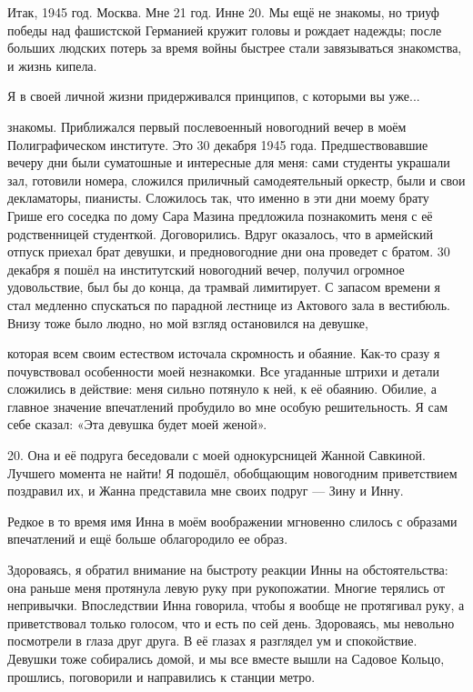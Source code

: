 Итак, 1945 год. Москва. Мне 21 год. Инне 20. Мы ещё не знакомы, но триуф  победы над фашистской Германией кружит головы и рождает надежды; после больших людских потерь за время войны быстрее стали завязываться знакомства, и жизнь кипела.

Я в своей личной жизни придерживался принципов, с которыми вы уже...

\label{304-1}
знакомы.
Приближался первый послевоенный новогодний вечер в моём Полиграфическом институте. Это 30 декабря 1945 года. Предшествовавшие вечеру дни были суматошные и интересные для меня: сами студенты украшали зал, готовили номера, сложился приличный самодеятельный оркестр, были и свои декламаторы, пианисты.
Сложилось так, что именно в эти дни моему брату Грише его соседка по дому Сара Мазина предложила познакомить меня с её родственницей студенткой. Договорились. Вдруг оказалось, что в армейский отпуск приехал брат девушки, и предновогодние дни она проведет с братом.
30 декабря я пошёл на институтский новогодний вечер, получил огромное удовольствие, был бы до конца, да трамвай лимитирует. С запасом времени я стал медленно спускаться по парадной лестнице из Актового зала в вестибюль. Внизу тоже было людно, но мой взгляд остановился на девушке,

\label{305-1}
которая всем своим естеством источала скромность и обаяние. Как-то сразу я почувствовал особенности моей незнакомки. Все угаданные штрихи и детали сложились в действие: меня сильно потянуло к ней, к её обаянию. Обилие, а главное значение впечатлений пробудило во мне особую решительность. Я сам себе сказал: «Эта девушка будет моей женой».

20. Она и её подруга беседовали с моей однокурсницей Жанной Савкиной. 
Лучшего момента не найти! Я подошёл, обобщающим новогодним приветствием поздравил их, и Жанна представила мне своих подруг — Зину и Инну.

Редкое в то время имя Инна в моём воображении мгновенно слилось с образами впечатлений и ещё больше облагородило ее образ.

\label{306-1}
Здороваясь, я обратил внимание на быстроту реакции Инны на обстоятельства: она раньше меня протянула левую руку при рукопожатии. Многие терялись от непривычки. Впоследствии Инна говорила, чтобы я вообще не протягивал руку, а приветствовал только голосом, что и есть по сей день. Здороваясь, мы невольно посмотрели в глаза друг друга. В её глазах я разглядел ум и спокойствие. Девушки тоже собирались домой, и мы все вместе вышли на Садовое Кольцо, прошлись, поговорили и направились к станции метро.


